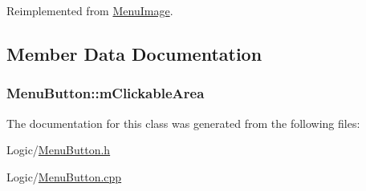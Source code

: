 Reimplemented from \hyperlink{classMenuImage_a1c54191212d06d40c596f09ec428f361}{Menu\+Image}.



\subsection{Member Data Documentation}
\subsubsection[{\texorpdfstring{m\+Clickable\+Area}{mClickableArea}}]{ Menu\+Button\+::m\+Clickable\+Area\hspace{0.3cm}{\ttfamily [private]}}\hypertarget{classMenuButton_afe071c8fd0b4bf7cd91e7e027f42c3a4}{}\label{classMenuButton_afe071c8fd0b4bf7cd91e7e027f42c3a4}


The documentation for this class was generated from the following files\+:\begin{DoxyCompactItemize}
\item 
Logic/\hyperlink{MenuButton_8h}{Menu\+Button.\+h}\item 
Logic/\hyperlink{MenuButton_8cpp}{Menu\+Button.\+cpp}\end{DoxyCompactItemize}
